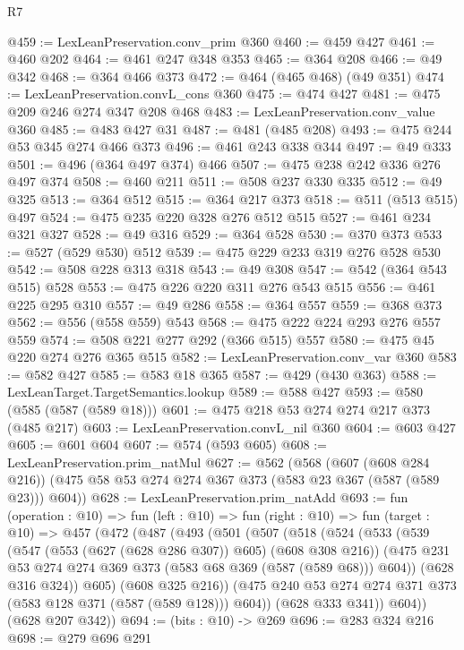 \begin{lexlean}{R7}
\begin{coremodule}
@459 := LexLeanPreservation.conv_prim @360
@460 := @459 @427
@461 := @460 @202
@464 := @461 @247 @348 @353
@465 := @364 @208
@466 := @49 @342
@468 := @364 @466 @373
@472 := @464 (@465 @468) (@49 @351)
@474 := LexLeanPreservation.convL_cons @360
@475 := @474 @427
@481 := @475 @209 @246 @274 @347 @208 @468
@483 := LexLeanPreservation.conv_value @360
@485 := @483 @427 @31
@487 := @481 (@485 @208)
@493 := @475 @244 @53 @345 @274 @466 @373
@496 := @461 @243 @338 @344
@497 := @49 @333
@501 := @496 (@364 @497 @374) @466
@507 := @475 @238 @242 @336 @276 @497 @374
@508 := @460 @211
@511 := @508 @237 @330 @335
@512 := @49 @325
@513 := @364 @512
@515 := @364 @217 @373
@518 := @511 (@513 @515) @497
@524 := @475 @235 @220 @328 @276 @512 @515
@527 := @461 @234 @321 @327
@528 := @49 @316
@529 := @364 @528
@530 := @370 @373
@533 := @527 (@529 @530) @512
@539 := @475 @229 @233 @319 @276 @528 @530
@542 := @508 @228 @313 @318
@543 := @49 @308
@547 := @542 (@364 @543 @515) @528
@553 := @475 @226 @220 @311 @276 @543 @515
@556 := @461 @225 @295 @310
@557 := @49 @286
@558 := @364 @557
@559 := @368 @373
@562 := @556 (@558 @559) @543
@568 := @475 @222 @224 @293 @276 @557 @559
@574 := @508 @221 @277 @292 (@366 @515) @557
@580 := @475 @45 @220 @274 @276 @365 @515
@582 := LexLeanPreservation.conv_var @360
@583 := @582 @427
@585 := @583 @18 @365
@587 := @429 (@430 @363)
@588 := LexLeanTarget.TargetSemantics.lookup
@589 := @588 @427
@593 := @580 (@585 (@587 (@589 @18)))
@601 := @475 @218 @53 @274 @274 @217 @373 (@485 @217)
@603 := LexLeanPreservation.convL_nil @360
@604 := @603 @427
@605 := @601 @604
@607 := @574 (@593 @605)
@608 := LexLeanPreservation.prim_natMul
@627 := @562
    (@568
      (@607 (@608 @284 @216))
      (@475 @58 @53 @274 @274 @367 @373 (@583 @23 @367 (@587 (@589 @23))) @604))
@628 := LexLeanPreservation.prim_natAdd
@693 := fun (operation : @10) =>
  fun (left : @10) =>
  fun (right : @10) =>
  fun (target : @10) =>
  @457
    (@472
      (@487
        (@493
          (@501
            (@507
              (@518
                (@524
                  (@533
                    (@539
                      (@547 (@553 (@627 (@628 @286 @307)) @605) (@608 @308 @216))
                      (@475 @231 @53 @274 @274 @369 @373 (@583 @68 @369 (@587 (@589 @68))) @604))
                    (@628 @316 @324))
                  @605)
                (@608 @325 @216))
              (@475 @240 @53 @274 @274 @371 @373 (@583 @128 @371 (@587 (@589 @128))) @604))
            (@628 @333 @341))
          @604))
      (@628 @207 @342))
@694 := (bits : @10) -> @269
@696 := @283 @324 @216
@698 := @279 @696 @291

\end{coremodule}
\end{lexlean}
